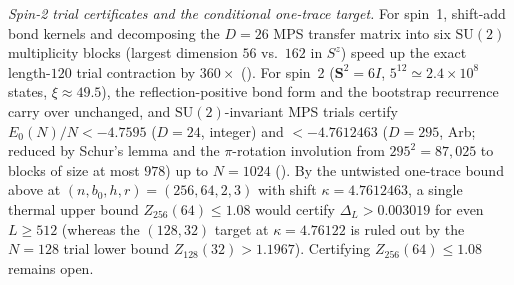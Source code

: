 \documentclass[aps,prl,reprint,amsmath,amssymb,nofootinbib,raggedbottom]{revtex4-2}
\begin{document}
\emph{Spin-2 trial certificates and the conditional one-trace target.}
For spin~1, shift-add bond kernels and decomposing the $D=26$ MPS transfer
matrix into six $\mathrm{SU}(2)$ multiplicity blocks (largest dimension $56$
vs.\ $162$ in $S^z$) speed up the exact length-$120$ trial contraction by
$360\times$ (). For spin~2 ($\bm S^2=6I$, $5^{12}\simeq2.4\times10^8$
states, $\xi\approx49.5$), the reflection-positive bond form and the bootstrap
recurrence carry over unchanged, and $\mathrm{SU}(2)$-invariant MPS trials
certify $E_0(N)/N<-4.7595$ ($D=24$, integer) and $<-4.7612463$ ($D=295$, Arb;
reduced by Schur's lemma and the $\pi$-rotation involution from
$295^2=87{,}025$ to blocks of size at most $978$) up to $N=1024$
(). By the untwisted one-trace bound above at
$(n,b_0,h,r)=(256,64,2,3)$ with shift $\kappa=4.7612463$, a single thermal upper
bound $Z_{256}(64)\le1.08$ would certify $\Delta_L>0.003019$ for even
$L\ge512$ (whereas the $(128,32)$ target at $\kappa=4.76122$ is ruled out by
the $N=128$ trial lower bound $Z_{128}(32)>1.1967$). Certifying
$Z_{256}(64)\le1.08$ remains open.
\end{document}
